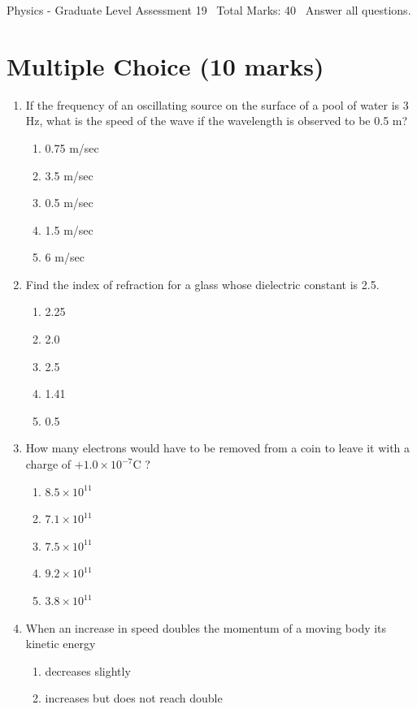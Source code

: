 \documentclass[12pt]{article}
\begin{document}
\begin{center}
Physics - Graduate Level Assessment 19 \
Total Marks: 40 \
Answer all questions.
\end{center}

\section*{Multiple Choice (10 marks)}
\begin{enumerate}[label=\arabic*.]
\item If the frequency of an oscillating source on the surface of a pool of water is 3 Hz, what is the speed of the wave if the wavelength is observed to be 0.5 m?
\begin{enumerate}[label=(\alph*)]
    \item 0.75 m/sec
    \item 3.5 m/sec
    \item 0.5 m/sec
    \item 1.5 m/sec
    \item 6 m/sec
\end{enumerate}
\item Find the index of refraction for a glass whose dielectric constant is 2.5.
\begin{enumerate}[label=(\alph*)]
    \item 2.25
    \item 2.0
    \item 2.5
    \item 1.41
    \item 0.5
\end{enumerate}
\item How many electrons would have to be removed from a coin to leave it with a charge of $+1.0 \times 10^{-7} \mathrm{C}$ ?
\begin{enumerate}[label=(\alph*)]
    \item $8.5 \times 10^{11}$
    \item $7.1 \times 10^{11}$
    \item $7.5 \times 10^{11}$
    \item $9.2 \times 10^{11}$
    \item $3.8 \times 10^{11}$
\end{enumerate}
\item When an increase in speed doubles the momentum of a moving body its kinetic energy
\begin{enumerate}[label=(\alph*)]
    \item decreases slightly
    \item increases but does not reach double

\end{enumerate}
\end{enumerate}
\end{document}
